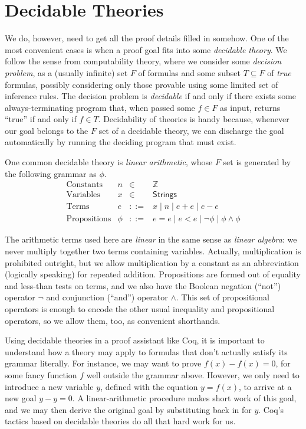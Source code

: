 \documentclass{amsbook}
\theoremstyle{definition}
\theoremstyle{remark}
\numberwithin{section}{chapter}
\numberwithin{equation}{chapter}
\begin{document}
\section{\label{decidable}Decidable Theories}

We do, however, need to get all the proof details filled in somehow.
One of the most convenient cases is when a proof goal fits into some \emph{decidable theory}.
We follow the sense from computability theory, where we consider some \emph{decision problem}, as a (usually infinite) set $F$ of formulas and some subset $T \subseteq F$ of \emph{true} formulas, possibly considering only those provable using some limited set of inference rules.
The decision problem is \emph{decidable} if and only if there exists some always-terminating program that, when passed some $f \in F$ as input, returns ``true'' if and only if $f \in T$.
Decidability of theories is handy because, whenever our goal belongs to the $F$ set of a decidable theory, we can discharge the goal automatically by running the deciding program that must exist.

One common decidable theory is \emph{linear arithmetic}, whose $F$ set is generated by the following grammar as $\phi$.
$$\begin{array}{rrcl}
  \textrm{Constants} & n &\in& \mathbb Z \\
  \textrm{Variables} & x &\in& \mathsf{Strings} \\
  \textrm{Terms} & e &::=& x \mid n \mid e + e \mid e - e \\
  \textrm{Propositions} & \phi &::=& e = e \mid e < e \mid \neg \phi \mid \phi \land \phi
\end{array}$$

The arithmetic terms used here are \emph{linear} in the same sense as \emph{linear algebra}: we never multiply together two terms containing variables.
Actually, multiplication is prohibited outright, but we allow multiplication by a constant as an abbreviation (logically speaking) for repeated addition.
Propositions are formed out of equality and less-than tests on terms, and we also have the Boolean negation (``not'') operator $\neg$ and conjunction (``and'') operator $\land$.
This set of propositional operators is enough to encode the other usual inequality and propositional operators, so we allow them, too, as convenient shorthands.

Using decidable theories in a proof assistant like Coq, it is important to understand how a theory may apply to formulas that don't actually satisfy its grammar literally.
For instance, we may want to prove $f(x) - f(x) = 0$, for some fancy function $f$ well outside the grammar above.
However, we only need to introduce a new variable $y$, defined with the equation $y = f(x)$, to arrive at a new goal $y - y = 0$.
A linear-arithmetic procedure makes short work of this goal, and we may then derive the original goal by substituting back in for $y$.
Coq's tactics based on decidable theories do all that hard work for us.
\end{document}
